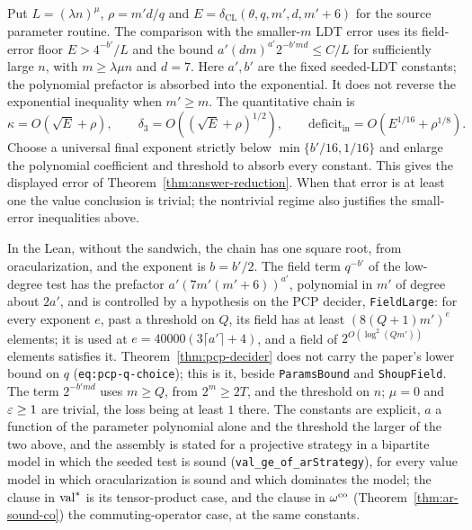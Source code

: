 \begin{lemma}
\label{lem:ar-error-assembly}
\leanok
Put $L=(\lambda n)^\mu$, $\rho=m'd/q$ and
$E=\delta_{\mathrm{CL}}(\theta,q,m',d,m'+6)$ for the source parameter
routine. The comparison with the smaller-$m$ LDT error uses its field-error
floor $E>4^{-b'}/L$ and the bound
$a'(dm)^{a'}2^{-b'md}\leq C/L$ for sufficiently large $n$, with
$m\geq\lambda\mu n$ and $d=7$. Here $a',b'$ are the fixed seeded-LDT
constants; the polynomial prefactor is absorbed into the exponential.
It does not reverse the exponential inequality when $m'\geq m$.
The quantitative chain is
\[
 \kappa=O(\sqrt E+\rho),\qquad
 \delta_3=O((\sqrt E+\rho)^{1/2}),\qquad
 \mathrm{deficit}_{\mathrm{in}}=O(E^{1/16}+\rho^{1/8}).
\]
Choose a universal final exponent strictly below $\min\{b'/16,1/16\}$
and enlarge the polynomial coefficient and threshold to absorb every
constant. This gives the displayed error of Theorem~\ref{thm:answer-reduction}.
When that error is at least one the value conclusion is trivial; the
nontrivial regime also justifies the small-error inequalities above.

In the Lean, without the sandwich, the chain has one square root, from oracularization, and the
exponent is $b=b'/2$. The field term $q^{-b'}$ of the low-degree test has the prefactor
$a'(7m'(m'+6))^{a'}$, polynomial in $m'$ of degree about $2a'$, and is controlled by a hypothesis
on the PCP decider, \texttt{FieldLarge}: for every exponent $e$, past a threshold on $Q$, its
field has at least $(8(Q+1)m')^{e}$ elements; it is used at $e=40000(3\lceil a'\rceil+4)$, and a
field of $2^{O(\log^2(Qm'))}$ elements satisfies it. Theorem~\ref{thm:pcp-decider} does not carry the paper's lower
bound on $q$ (\texttt{eq:pcp-q-choice}); this is it, beside \texttt{ParamsBound} and
\texttt{ShoupField}. The term $2^{-b'md}$ uses $m\geq Q$, from $2^m\geq 2T$, and the threshold
on $n$; $\mu=0$ and $\varepsilon\geq 1$ are trivial, the loss being at least $1$ there. The constants
are explicit, $a$ a function of the parameter polynomial alone and the threshold the larger of
the two above, and the assembly is stated for a projective strategy in a bipartite model in which
the seeded test is sound (\texttt{val\_ge\_of\_arStrategy}), for every value model in which
oracularization is sound and which dominates the model; the clause in $\mathrm{val}^*$ is its
tensor-product case, and the clause in $\omega^{\mathrm{co}}$ (Theorem~\ref{thm:ar-sound-co}) the
commuting-operator case, at the same constants.
\end{lemma}

